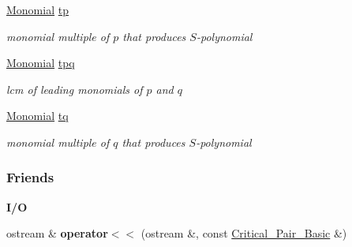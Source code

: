\begin{DoxyCompactItemize}
\mbox{\label{group___g_b_computation_a9b232e6359525154a6d7865e607964bb}} 
\hyperlink{group__polygroup_class_monomial}{Monomial} \hyperlink{group___g_b_computation_a9b232e6359525154a6d7865e607964bb}{tp}
\begin{DoxyCompactList}\small\item\em monomial multiple of $p$ that produces $S$-\/polynomial \end{DoxyCompactList}\item 
\mbox{\label{group___g_b_computation_a91d6dc4856d8fb137faf8ffe2b823ae8}} 
\hyperlink{group__polygroup_class_monomial}{Monomial} \hyperlink{group___g_b_computation_a91d6dc4856d8fb137faf8ffe2b823ae8}{tpq}
\begin{DoxyCompactList}\small\item\em lcm of leading monomials of $p$ and $q$ \end{DoxyCompactList}\item 
\mbox{\label{group___g_b_computation_a7e67ffb4af6c13830c95253e464bc3a3}} 
\hyperlink{group__polygroup_class_monomial}{Monomial} \hyperlink{group___g_b_computation_a7e67ffb4af6c13830c95253e464bc3a3}{tq}
\begin{DoxyCompactList}\small\item\em monomial multiple of $q$ that produces $S$-\/polynomial \end{DoxyCompactList}\end{DoxyCompactItemize}
\subsubsection*{Friends}
\begin{Indent}\textbf{ I/O}\par
\begin{DoxyCompactItemize}
\item 
\mbox{\label{group___g_b_computation_a142698d76b6358faf451f21bf929c993}} 
ostream \& {\bfseries operator$<$$<$} (ostream \&, const \hyperlink{group___g_b_computation_class_critical___pair___basic}{Critical\+\_\+\+Pair\+\_\+\+Basic} \&)
\end{DoxyCompactItemize}
\end{Indent}


